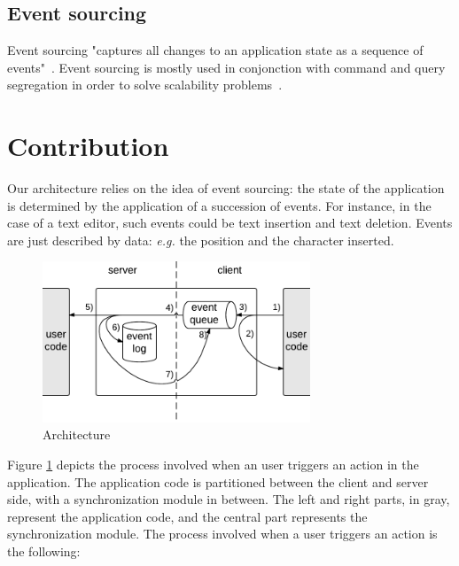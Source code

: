 \documentclass{llncs}
\begin{document}
\cite{Benson10_SyncKit}

\subsection{Event sourcing}

Event sourcing "captures all changes to an application state as a sequence of events"~\cite{Fowler05_ES}. Event sourcing is mostly used in conjonction with command and query segregation in order to solve scalability problems~\cite{Betts13_CQRS}.

\section{Contribution}

Our architecture relies on the idea of event sourcing: the state of the application is determined by the application of a succession of events. For instance, in the case of a text editor, such events could be text insertion and text deletion. Events are just described by data: \emph{e.g.} the position and the character inserted.

\begin{figure}
\centering
\includegraphics[width=8cm]{arch.pdf}
\caption{Architecture}
\label{fig-arch}
\end{figure}

Figure \ref{fig-arch} depicts the process involved when an user triggers an action in the application. The application code is partitioned between the client and server side, with a synchronization module in between. The left and right parts, in gray, represent the application code, and the central part represents the synchronization module. The process involved when a user triggers an action is the following:
\end{document}
